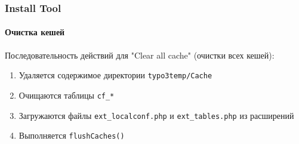 
\begin{frame}[fragile]
	\frametitle{Install Tool}
	\framesubtitle{Очистка кешей}

	Последовательность действий для "Clear all cache" (очистки всех кешей):

	\begin{enumerate}
		\item Удаляется содержимое директории \texttt{typo3temp/Cache}
		\item Очищаются таблицы \texttt{cf\_*}
		\item Загружаются файлы \texttt{ext\_localconf.php} и \texttt{ext\_tables.php}\newline
			из расширений
		\item Выполняется \texttt{flushCaches()}
	\end{enumerate}

\end{frame}


